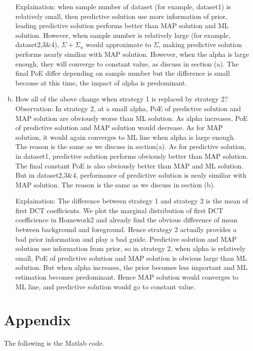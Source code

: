 \documentclass[12pt,letterpaper]{article}
\begin{document}
\begin{enumerate}[a)]
        Explaination: when sample number of dataset (for example, dataset1) is relatively small, then predictive solution
        use more information of prior, leading predictive solution performs better than MAP solution
        and ML solution. However, when sample number is relatively large (for example, dataset2,3\&4),
        $\Sigma+\Sigma_n$ would approximate to $\Sigma$, making predictive solution performs nearly similiar
        with MAP solution. However, when the alpha is large enough, they will converge to constant value,
        as discuss in section (a). The final PoE differ depending on sample number but the difference is small
        because at this time, the impact of alpha is predominant.
        \item 
        How all of the above change when strategy 1 is replaced by strategy 2?\\
        Observation: In strategy 2, at a small alpha, PoE of predictive solution and MAP solution are
        obviously worse than ML solution. As alpha increases, PoE of predictive solution and MAP solution
        would decrease. As for MAP solution, it would again converges to ML line when alpha is large enough.
        The reason is the same as we discuss in section(a). As for predictive solution, in dataset1, predictive
        solution performs obviously better than MAP solution. The final constant PoE is also obviously better
        than MAP and ML solution. But in dataset2,3\&4, performance of predictive solution is nealy similiar
        with MAP solution. The reason is the same as we discuss in section (b).

        Explaination: The difference between strategy 1 and strategy 2 is the mean of first DCT coefficients.
        We plot the marginal distribution of first DCT coefficience in Homework2 and already find the obvious
        difference of mean between background and foreground. Hence strategy 2 actually provides a bad prior information
        and play a bad guide. Predictive solution and MAP solution use information from prior, so in strategy 2,
        when alpha is relatively small, PoE of predictive solution and MAP solution is obvious large than ML solution.
        But when alpha increases, the prior becomes less important and ML estimation becomes predominant. Hence MAP solution
        would converges to ML line, and predictive solution would go to constant value.
    \end{enumerate}

    \section*{Appendix}
    The following is the Matlab code.
\end{document}
